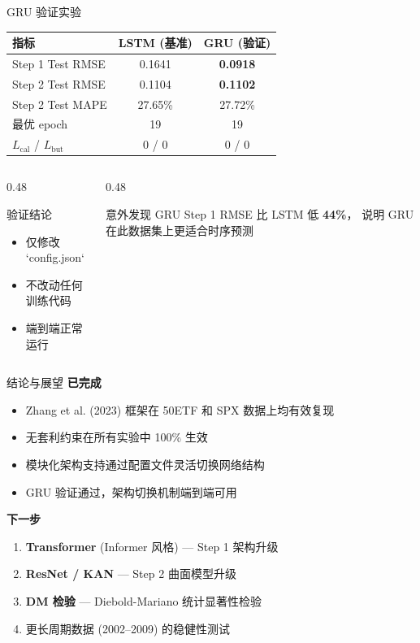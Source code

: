 \documentclass[aspectratio=169]{beamer}
\begin{document}
\begin{frame}{GRU 验证实验}
\begin{table}
\centering
\begin{tabular}{@{}lcc@{}}
\toprule
\textbf{指标} & \textbf{LSTM (基准)} & \textbf{GRU (验证)} \\
\midrule
Step 1 Test RMSE & 0.1641 & \textbf{0.0918} \\
Step 2 Test RMSE & 0.1104 & \textbf{0.1102} \\
Step 2 Test MAPE & 27.65\% & 27.72\% \\
最优 epoch & 19 & 19 \\
$L_{\text{cal}}$ / $L_{\text{but}}$ & 0 / 0 & 0 / 0 \\
\bottomrule
\end{tabular}
\end{table}

\vspace{0.3cm}
\begin{columns}
\begin{column}{0.48\textwidth}
\begin{block}{验证结论}
\begin{itemize}
    \item 仅修改 `config.json`
    \item 不改动任何训练代码
    \item 端到端正常运行
\end{itemize}
\end{block}
\end{column}
\begin{column}{0.48\textwidth}
\begin{alertblock}{意外发现}
GRU Step 1 RMSE 比 LSTM 低 \textbf{44\%}，
说明 GRU 在此数据集上更适合时序预测
\end{alertblock}
\end{column}
\end{columns}
\end{frame}

\begin{frame}{结论与展望}
\textbf{已完成}
\begin{itemize}
    \item Zhang et al. (2023) 框架在 50ETF 和 SPX 数据上均有效复现
    \item 无套利约束在所有实验中 100\% 生效
    \item 模块化架构支持通过配置文件灵活切换网络结构
    \item GRU 验证通过，架构切换机制端到端可用
\end{itemize}

\vspace{0.4cm}
\textbf{下一步}
\begin{enumerate}
    \item \textbf{Transformer} (Informer 风格) — Step 1 架构升级
    \item \textbf{ResNet / KAN} — Step 2 曲面模型升级
    \item \textbf{DM 检验} — Diebold-Mariano 统计显著性检验
    \item 更长周期数据 (2002--2009) 的稳健性测试
\end{enumerate}
\end{frame}
\end{document}

